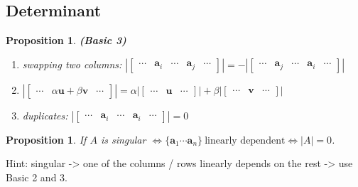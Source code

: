 \documentclass[13pt]{article}
\newtheorem{proposition}[theorem]{Proposition}
\theoremstyle{definition}
\theoremstyle{remark}
\begin{document}
\begin{multicols}{2}
    \section{Determinant}
\begin{proposition}\textbf{(Basic 3)}\hfill
    \begin{enumerate}
        \item swapping two columns: $|\begin{bmatrix}
            \cdots & \bm{a}_i & \cdots & \bm{a}_j & \cdots
        \end{bmatrix}| = -|\begin{bmatrix}
            \cdots & \bm{a}_j & \cdots & \bm{a}_i & \cdots
        \end{bmatrix}|$ 
         \item $|\begin{bmatrix}
            \cdots & \alpha\bm{u}+\beta\bm{v} & \cdots
        \end{bmatrix}| = \alpha|\begin{bmatrix}
             \cdots & \bm{u} & \cdots
        \end{bmatrix}| + \beta|\begin{bmatrix}
            \cdots & \bm{v} & \cdots 
        \end{bmatrix}|$
        \item duplicates: $|\begin{bmatrix}
            \cdots & \bm{a}_i & \cdots & \bm{a}_i & \cdots
        \end{bmatrix}| = 0$
    \end{enumerate}
    \end{proposition}
    
    \begin{proposition}
    If $A$ is singular $\Longleftrightarrow \{\bm{a}_1 \cdots \bm{a}_n\} ~\text{linearly dependent} \Longleftrightarrow  |A|=0$. 
    \end{proposition}
    Hint: singular -> one of the columns / rows linearly depends on the rest -> use Basic 2 and 3.
    

\end{multicols}
\end{document}
